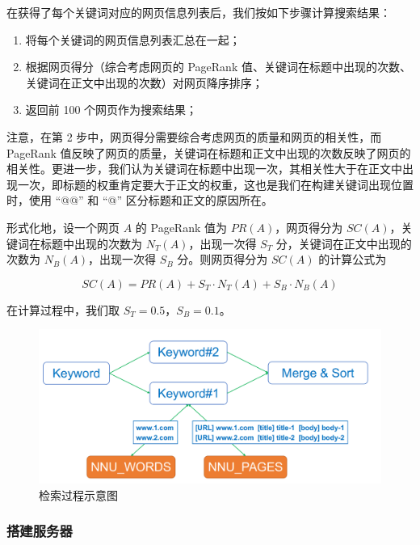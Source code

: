 \documentclass{ctexart}
\begin{document}
    在获得了每个关键词对应的网页信息列表后，我们按如下步骤计算搜索结果：

    \begin{enumerate}
        \item 将每个关键词的网页信息列表汇总在一起；
        \item 根据网页得分（综合考虑网页的 PageRank 值、关键词在标题中出现的次数、关键词在正文中出现的次数）对网页降序排序；
        \item 返回前 100 个网页作为搜索结果；
    \end{enumerate}

    注意，在第 2 步中，网页得分需要综合考虑网页的质量和网页的相关性，而 PageRank 值反映了网页的质量，关键词在标题和正文中出现的次数反映了网页的相关性。更进一步，我们认为关键词在标题中出现一次，其相关性大于在正文中出现一次，即标题的权重肯定要大于正文的权重，这也是我们在构建关键词出现位置时，使用 “@@” 和 “@” 区分标题和正文的原因所在。

    形式化地，设一个网页 $A$ 的 PageRank 值为 $PR(A)$，网页得分为 $SC(A)$，关键词在标题中出现的次数为 $N_T(A)$，出现一次得 $S_T$ 分，关键词在正文中出现的次数为 $N_B(A)$，出现一次得 $S_B$ 分。则网页得分为 $SC(A)$ 的计算公式为

    $$ SC(A) = PR(A) + S_T \cdot N_T(A) + S_B \cdot N_B(A) $$

    在计算过程中，我们取 $S_T=0.5$，$S_B=0.1$。

    \begin{figure}[t]
        \centering
        \includegraphics[width=\textwidth]{src/retrieve}
        \caption{检索过程示意图}
        \label{fig:retrieve}
    \end{figure}

    \subsubsection{搭建服务器}\label{subsubsec:retrieve_server}
\end{document}
